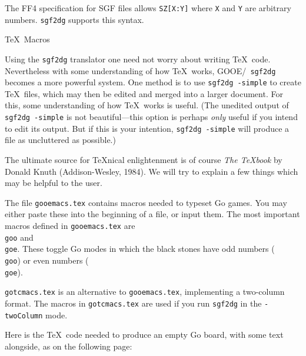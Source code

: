 The FF4 specification for SGF files allows {\tt SZ[X:Y]} where {\tt X} and
{\tt Y} are arbitrary numbers.  {\tt sgf2dg} supports this syntax.

\vfil\eject
\centerline{\titlefont\TeX\ Macros}

\bigbreak
Using the {\tt sgf2dg} translator one need not worry about writing \TeX\
code. Nevertheless with some understanding of how \TeX\ works, GOOE/{\tt
sgf2dg} becomes a more powerful system. One method is to use {\tt sgf2dg
-simple} to create \TeX\ files, which may then be edited and merged into a
larger document. For this, some understanding of how \TeX\ works is useful.
(The unedited output of {\tt sgf2dg -simple} is not beautiful---this 
option is perhaps {\it only} useful if you intend to edit its output.
But if this is your intention, {\tt sgf2dg -simple} will produce a file
as uncluttered as possible.)

The ultimate source for \TeX nical enlightenment is of course
{\it The \TeX book} by Donald Knuth (Addison-Wesley, 1984). We will try
to explain a few things which may be helpful to the user.

The file {\tt gooemacs.tex} contains macros needed to typeset Go games. You
may either paste these into the beginning of a file, or input them. 
The most important macros defined in {\tt gooemacs.tex} are {\tt \\goo} and
{\tt\\goe}. These toggle Go modes in which the black stones have odd numbers
({\tt \\goo}) or even numbers ({\tt \\goe}).

{\tt gotcmacs.tex} is an alternative to {\tt gooemacs.tex}, implementing
a two-column format. The macros in {\tt gotcmacs.tex} are used if you run
{\tt sgf2dg} in the {\tt -twoColumn} mode.

Here is the \TeX\ code needed to produce an empty Go board, with some text
alongside, as on the following page:

